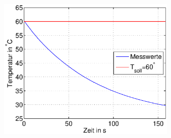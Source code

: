 \begin{frame}
\begin{columns}[c]
\begin{figure}[H]
\begin{center}
            \end{center}
            \end{figure}
            \begin{figure}[H]
            \begin{center}
                    \includegraphics[scale=0.3]{./img/plots/2_e_td_1_2.eps}
            \end{center}
            \end{figure}
    \end{columns}
\end{frame}
